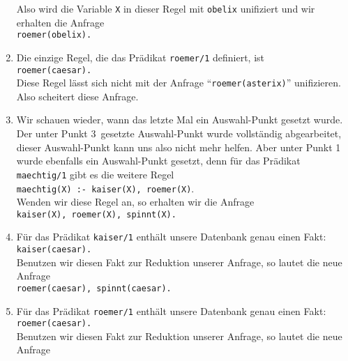 \begin{enumerate}
      Also wird die Variable \texttt{X} in dieser Regel mit \texttt{obelix} 
      unifiziert und wir erhalten die Anfrage \\[0.2cm]
      \hspace*{1.3cm} 
      \texttt{roemer(obelix).}
\item Die einzige Regel, die das Pr\"{a}dikat \texttt{roemer/1} definiert, ist \\[0.2cm]
      \hspace*{1.3cm} 
      \texttt{roemer(caesar).} \\[0.2cm]
      Diese Regel l\"{a}sst sich nicht mit der Anfrage ``\texttt{roemer(asterix)}'' unifizieren.
      Also scheitert diese Anfrage.
\item Wir schauen wieder, wann das letzte Mal ein Auswahl-Punkt gesetzt wurde.
      Der unter Punkt 3~gesetzte Auswahl-Punkt wurde vollst\"{a}ndig abgearbeitet, dieser
      Auswahl-Punkt kann uns also nicht mehr helfen.
      Aber unter Punkt 1 wurde ebenfalls ein Auswahl-Punkt gesetzt, denn f\"{u}r das Pr\"{a}dikat
      \texttt{maechtig/1} gibt es die weitere Regel \\[0.2cm]
      \hspace*{1.3cm} \texttt{maechtig(X) :- kaiser(X), roemer(X)}. \\[0.2cm]
      Wenden wir diese Regel an, so erhalten wir die Anfrage \\[0.2cm]
      \hspace*{1.3cm} 
      \texttt{kaiser(X), roemer(X), spinnt(X).}
\item F\"{u}r das Pr\"{a}dikat \texttt{kaiser/1} enth\"{a}lt unsere Datenbank genau einen Fakt:\\[0.2cm]
      \hspace*{1.3cm} \texttt{kaiser(caesar).}  \\[0.2cm]
      Benutzen wir diesen Fakt zur Reduktion unserer Anfrage, so  lautet die neue Anfrage \\[0.2cm]
      \hspace*{1.3cm} 
      \texttt{roemer(caesar), spinnt(caesar).}
\item F\"{u}r das Pr\"{a}dikat \texttt{roemer/1} enth\"{a}lt unsere Datenbank genau einen Fakt:\\[0.2cm]
      \hspace*{1.3cm} \texttt{roemer(caesar).}  \\[0.2cm]
      Benutzen wir diesen Fakt zur Reduktion unserer Anfrage, so  lautet die neue Anfrage \\[0.2cm]
      \hspace*{1.3cm} 

\end{enumerate}
